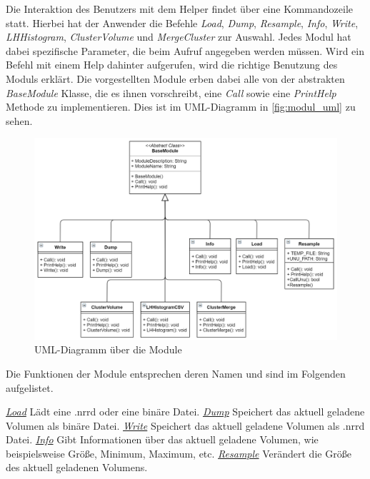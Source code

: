 Die Interaktion des Benutzers mit dem Helper findet über eine Kommandozeile statt. Hierbei hat der Anwender die Befehle \textit{Load}, \textit{Dump}, \textit{Resample}, \textit{Info}, \textit{Write}, \textit{LHHistogram}, \textit{ClusterVolume} und \textit{MergeCluster} zur Auswahl. Jedes Modul hat dabei spezifische Parameter, die beim Aufruf angegeben werden müssen. Wird ein Befehl mit einem Help dahinter aufgerufen, wird die richtige Benutzung des Moduls erklärt.
Die vorgestellten Module erben dabei alle von der abstrakten \textit{BaseModule} Klasse, die es ihnen vorschreibt, eine \textit{Call} sowie eine \textit{PrintHelp} Methode zu implementieren. Dies ist im UML-Diagramm in \autoref{fig:modul_uml} zu sehen.


\begin{figure}[h]
\centering 
\includegraphics[width=\textwidth]{Logos/Modules_UML.PNG}
\caption{UML-Diagramm über die Module} 
\label{fig:modul_uml} 
\end{figure}


Die Funktionen der Module entsprechen deren Namen und sind im Folgenden aufgelistet.


\underline{\textit{Load}}
\newline
Lädt eine .nrrd oder eine binäre Datei.
\newline
\underline{\textit{Dump}}
\newline
Speichert das aktuell geladene Volumen als binäre Datei.
\newline
\underline{\textit{Write}}
\newline
Speichert das aktuell geladene Volumen als .nrrd Datei.
\newline
\underline{\textit{Info}}
\newline
Gibt Informationen über das aktuell geladene Volumen, wie beispielsweise Größe, Minimum, Maximum, etc.
\newline
\underline{\textit{Resample}}
\newline
Verändert die Größe des aktuell geladenen Volumens.


